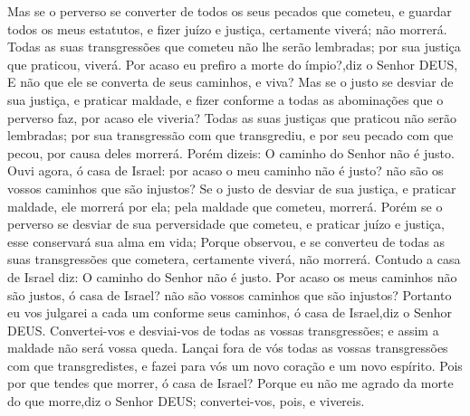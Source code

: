 {  Mas se o perverso se converter de todos os seus pecados que cometeu, e
{} guardar todos os meus estatutos, e fizer juízo e justiça, certamente viverá; não morrerá.
  Todas as suas transgressões que cometeu não lhe serão lembradas; por sua justiça que praticou, viverá.
  Por acaso eu prefiro
 a morte do ímpio?,diz o Senhor DEUS, E não que ele se converta de seus caminhos, e viva?
  Mas se o justo se desviar de sua justiça, e
{} praticar maldade, e fizer conforme a todas as abominações que o perverso faz, por acaso ele viveria? Todas as suas justiças que praticou não serão lembradas; por sua transgressão com que transgrediu, e por seu pecado com que pecou, por causa deles
 morrerá.
  Porém dizeis: O caminho do Senhor não é justo. Ouvi agora, ó casa de Israel: por acaso o meu caminho não é justo?
{} não são os vossos caminhos que são injustos?
  Se o justo de desviar de sua justiça, e
{} praticar maldade, ele morrerá por ela; pela maldade que cometeu, morrerá.
  Porém se o perverso se desviar de sua perversidade que cometeu, e
{} praticar juízo e justiça, esse conservará sua alma em vida;
  Porque observou, e se converteu de todas as suas transgressões que cometera, certamente viverá, não morrerá.
  Contudo a casa de Israel diz: O caminho do Senhor não é justo. Por acaso os meus caminhos não são justos, ó casa de Israel?
{} não são vossos caminhos que são injustos?
  Portanto eu vos julgarei a cada um conforme seus
{} caminhos, ó casa de Israel,diz o Senhor DEUS. Convertei-vos e desviai-vos de todas as vossas transgressões; e assim a maldade não será vossa queda.
  Lançai fora de vós todas as vossas transgressões com que transgredistes, e fazei para vós um novo coração e um novo espírito. Pois por que tendes que morrer, ó casa de Israel?
  Porque eu não me agrado da morte do que morre,diz o Senhor DEUS; convertei-vos, pois, e vivereis.
\par }

